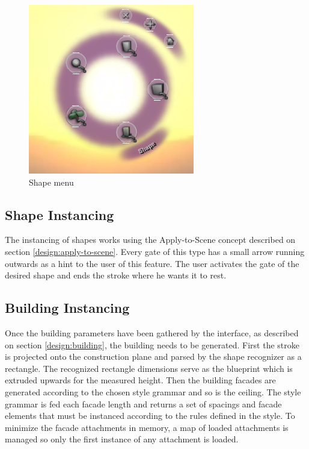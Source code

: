 \begin{figure}[ht]
	\centering
		\includegraphics[scale=0.5]{gfx/shape.png}
	\caption{Shape menu}
	\label{fig:shape}
\end{figure}


\subsection{Shape Instancing}

The instancing of shapes works using the Apply-to-Scene concept described on section \ref{design:apply-to-scene}.
Every gate of this type has a small arrow running outwards as a hint to the user of this feature.
The user activates the gate of the desired shape and ends the stroke where he wants it to rest.



\subsection{Building Instancing}

Once the building parameters have been gathered by the interface, as described on section \ref{design:building},
the building needs to be generated.
First the stroke is projected onto the construction plane and parsed by the shape recognizer as a rectangle.
The recognized rectangle dimensions serve as the blueprint which is extruded upwards for the measured height.
Then the building facades are generated according to the chosen style grammar and so is the ceiling.
The style grammar is fed each facade length and returns a set of spacings and facade elements that must be instanced
according to the rules defined in the style.
To minimize the facade attachments in memory, a map of loaded attachments is managed so only the first instance of any
attachment is loaded.


